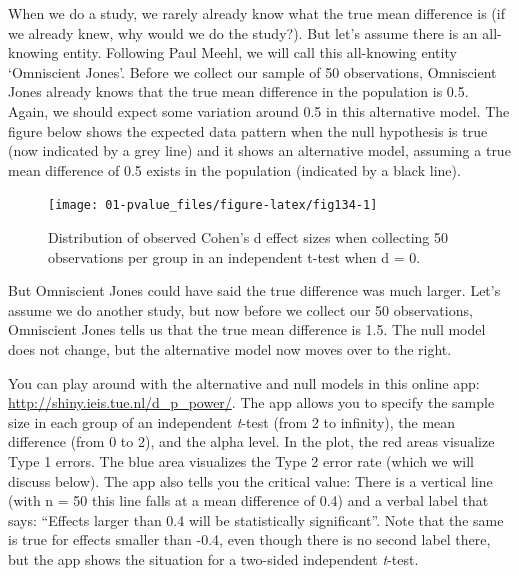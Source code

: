 \documentclass[
]{krantz}
\begin{document}
When we do a study, we rarely already know what the true mean difference is (if we already knew, why would we do the study?). But let's assume there is an all-knowing entity. Following Paul Meehl, we will call this all-knowing entity `Omniscient Jones'. Before we collect our sample of 50 observations, Omniscient Jones already knows that the true mean difference in the population is 0.5. Again, we should expect some variation around 0.5 in this alternative model. The figure below shows the expected data pattern when the null hypothesis is true (now indicated by a grey line) and it shows an alternative model, assuming a true mean difference of 0.5 exists in the population (indicated by a black line).

\begin{figure}

{\centering \texttt{[image: 01-pvalue\_files/figure-latex/fig134-1]} 

}

\caption{Distribution of observed Cohen's d effect sizes when collecting 50 observations per group in an independent t-test when d = 0.}\label{fig:fig134}
\end{figure}

But Omniscient Jones could have said the true difference was much larger. Let's assume we do another study, but now before we collect our 50 observations, Omniscient Jones tells us that the true mean difference is 1.5. The null model does not change, but the alternative model now moves over to the right.

You can play around with the alternative and null models in this online app: \url{http://shiny.ieis.tue.nl/d_p_power/}. The app allows you to specify the sample size in each group of an independent \emph{t}-test (from 2 to infinity), the mean difference (from 0 to 2), and the alpha level. In the plot, the red areas visualize Type 1 errors. The blue area visualizes the Type 2 error rate (which we will discuss below). The app also tells you the critical value: There is a vertical line (with n = 50 this line falls at a mean difference of 0.4) and a verbal label that says: ``Effects larger than 0.4 will be statistically significant''. Note that the same is true for effects smaller than -0.4, even though there is no second label there, but the app shows the situation for a two-sided independent \emph{t}-test.
\end{document}
